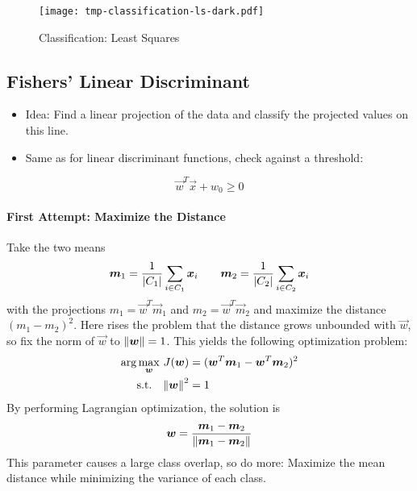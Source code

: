 				\begin{figure}
					\centering
					\texttt{[image: tmp-classification-ls-dark.pdf]}
					\caption{Classification: Least Squares}
					\label{fig:classificationLS}
				\end{figure}

		\subsection{Fishers' Linear Discriminant}
			\begin{itemize}
				\item Idea: Find a linear projection of the data and classify the projected values on this line.
				\item Same as for linear discriminant functions, check against a threshold:
			\end{itemize}
			\begin{equation}
				\vec{w}^T \vec{x} + w_0 \geq 0
			\end{equation}
			
			\paragraph{First Attempt: Maximize the Distance}
				Take the two means
				\begin{equation}
					\bm{m}_1 = \frac{1}{\abs{C_1}} \sum_{i \in C_1} \bm{x}_i \qquad \bm{m}_2 = \frac{1}{\abs{C_2}} \sum_{i \in C_2} \bm{x}_i
				\end{equation}
				with the projections \( m_1 = \vec{w}^T \vec{m}_1 \) and \( m_2 = \vec{w}^T \vec{m}_2 \) and maximize the distance \( (m_1 - m_2)^2 \). Here rises the problem that the distance grows unbounded with \(\vec{w}\), so fix the norm of \( \vec{w} \) to \( \norm{\bm{w}} = 1 \). This yields the following optimization problem:
				\begin{align}
					\arg\max\limits_{\bm{w}} \, J(\bm{w}) &= (\bm{w}^T \bm{m}_1 - \bm{w}^T \bm{m}_2)^2 \\
					\textrm{s.t.} \quad
					\norm{\bm{w}}^2 &= 1
				\end{align}
				By performing Lagrangian optimization, the solution is
				\begin{equation}
					\bm{w} = \frac{\bm{m}_1 - \bm{m}_2}{\norm{\bm{m}_1 - \bm{m}_2}}
				\end{equation}
				This parameter causes a large class overlap, so do more: Maximize the mean distance while minimizing the variance of each class.
			

